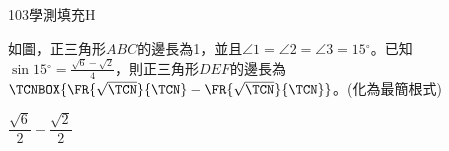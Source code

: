 \begin{QUESTIONS}
    \begin{QUESTION}
        \begin{ExamInfo}{103}{學測}{填充}{H}
        \end{ExamInfo}
        \begin{ExamAnsRateInfo}{28}{64}{18}{2}
        \end{ExamAnsRateInfo}
        \begin{QBODY}
			如圖，正三角形$ABC$的邊長為1，並且$\angle 1=\angle 2=\angle 3=15{}^\circ $。已知$\sin 15{}^\circ =\frac{\sqrt{6}-\sqrt{2}}{4}$，則正三角形$DEF$的邊長為$\TCNBOX{\FR{\sqrt{\TCN}}{\TCN}-\FR{\sqrt{\TCN}}{\TCN}}$。(化為最簡根式)
        \end{QBODY}
        \begin{QFROMS}
        \end{QFROMS}
        \begin{QTAGS}\end{QTAGS}
        \begin{QANS}
            $\dfrac{\sqrt{6}}{2}-\dfrac{\sqrt{2}}{2}$
        \end{QANS}
        \begin{QSOLLIST}
        \end{QSOLLIST}
        \begin{QEMPTYSPACE}
        \end{QEMPTYSPACE}
    \end{QUESTION}
\end{QUESTIONS}
